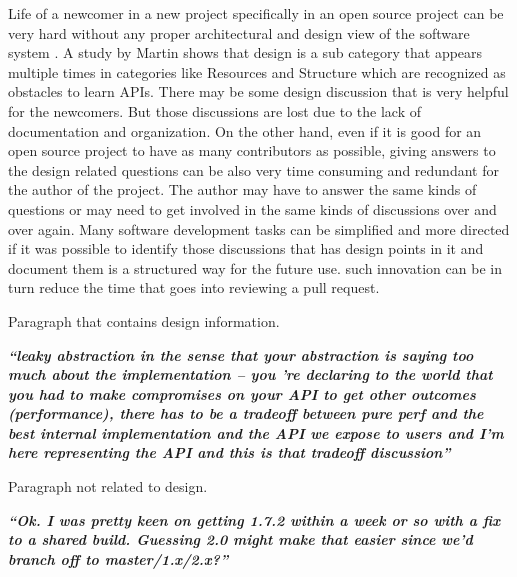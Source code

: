 Life of a newcomer in a new project specifically in an open source project can be very hard without any proper architectural and design view of the software system \cite{Steinmacher2014}. A study by Martin \cite{Robillard2009} shows that design is a sub category that appears multiple times in categories like Resources and Structure which are recognized as obstacles to learn APIs. There may be some design discussion that is very helpful for the newcomers. But those discussions are lost due to the lack of documentation and organization. On the other hand, even if it is good for an open source project to have as many contributors as possible, giving answers to the design related questions can be also very time consuming and redundant for the author of the project. The author may have to answer the same kinds of questions or may need to get involved in the same kinds of discussions over and over again. Many software development tasks can be simplified and more directed if it was possible to identify those discussions that has design points in it and document them is a structured way for the future use. such innovation can be in turn reduce the time that goes into reviewing a pull request.
\begin{table}
	\caption{Paragraph that contains design information.\cite{Viviani2018}}	
		\textbf{\textit{``leaky abstraction in the sense that your abstraction is saying too much about the implementation -- you 're declaring to the world that you had to make compromises on your API to get other outcomes (performance), there has to be a tradeoff between pure perf and the best internal implementation and the API we expose to users and I'm here representing the API and this is that tradeoff discussion''}}
	\label{tab:design}		
\end{table}
\begin{table}
	\caption{Paragraph not related to design.\cite{Viviani2018}}
	\textbf{\textit{``Ok. I was pretty keen on getting 1.7.2 within a week or so with a fix to a shared build. Guessing 2.0 might make that easier since we'd branch off to master/1.x/2.x?''}}
	\label{tab:general}
\end{table}

